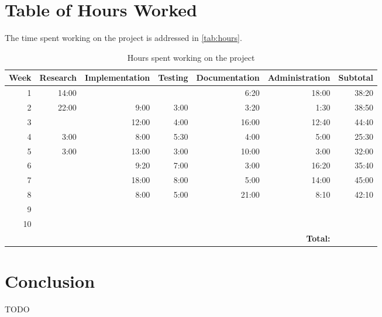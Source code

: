 \documentclass[12pt]{report}
\begin{document}
\section{Table of Hours Worked}
The time spent working on the project is addressed in \autoref{tab:hours}.
\begin{table}
\caption{Hours spent working on the project}
\label{tab:hours}
\begin{tabular}{| r | r | r | r | r | r | r |}
\hline
\scriptsize\textbf{Week} & \scriptsize\textbf{Research} & \scriptsize\textbf{Implementation} & \scriptsize\textbf{Testing} & \scriptsize\textbf{Documentation} & \scriptsize\textbf{Administration} & \scriptsize\textbf{Subtotal} \\
\hline\hline
1 & 14:00 &  &  & 6:20 & 18:00 & 38:20 \\
\hline
2 & 22:00 & 9:00 & 3:00 & 3:20 & 1:30 & 38:50 \\
\hline
3 &  & 12:00 & 4:00 & 16:00 & 12:40 & 44:40 \\
\hline
4 & 3:00 & 8:00 & 5:30 & 4:00 & 5:00 & 25:30 \\
\hline
5 & 3:00 & 13:00 & 3:00 & 10:00 & 3:00 & 32:00 \\
\hline
6 &  & 9:20 & 7:00 & 3:00 & 16:20 & 35:40 \\
\hline
7 &  & 18:00 & 8:00 & 5:00 & 14:00 & 45:00 \\
\hline
8 &  & 8:00 & 5:00 & 21:00 & 8:10 & 42:10 \\
\hline
9 &  &  &  &  &  & \\
\hline
10 &  &  &  &  &  & \\
\hline\hline
&&&&& \scriptsize\textbf{Total:} & \\
\hline
\end{tabular}
\end{table}

\section{Conclusion}
TODO
\end{document}
